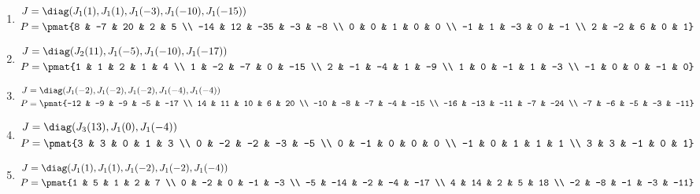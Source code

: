 \begin{enumerate}
\item

\begin{align*}
J &= \diag(J_{1}(1), J_{1}(1), J_{1}(-3), J_{1}(-10), J_{1}(-15))\\
P &= \pmat{8 & -7 & 20 & 2 & 5 \\ -14 & 12 & -35 & -3 & -8 \\ 0 & 0 & 1 & 0 & 0 \\ -1 & 1 & -3 & 0 & -1 \\ 2 & -2 & 6 & 0 & 1}
\end{align*}

\item

\begin{align*}
J &= \diag(J_{2}(11), J_{1}(-5), J_{1}(-10), J_{1}(-17))\\
P &= \pmat{1 & 1 & 2 & 1 & 4 \\ 1 & -2 & -7 & 0 & -15 \\ 2 & -1 & -4 & 1 & -9 \\ 1 & 0 & -1 & 1 & -3 \\ -1 & 0 & 0 & -1 & 0}
\end{align*}

\item

\begin{align*}
J &= \diag(J_{1}(-2), J_{1}(-2), J_{1}(-2), J_{1}(-4), J_{1}(-4))\\
P &= \pmat{-12 & -9 & -9 & -5 & -17 \\ 14 & 11 & 10 & 6 & 20 \\ -10 & -8 & -7 & -4 & -15 \\ -16 & -13 & -11 & -7 & -24 \\ -7 & -6 & -5 & -3 & -11}
\end{align*}

\item

\begin{align*}
J &= \diag(J_{3}(13), J_{1}(0), J_{1}(-4))\\
P &= \pmat{3 & 3 & 0 & 1 & 3 \\ 0 & -2 & -2 & -3 & -5 \\ 0 & -1 & 0 & 0 & 0 \\ -1 & 0 & 1 & 1 & 1 \\ 3 & 3 & -1 & 0 & 1}
\end{align*}

\item

\begin{align*}
J &= \diag(J_{1}(1), J_{1}(1), J_{1}(-2), J_{1}(-2), J_{1}(-4))\\
P &= \pmat{1 & 5 & 1 & 2 & 7 \\ 0 & -2 & 0 & -1 & -3 \\ -5 & -14 & -2 & -4 & -17 \\ 4 & 14 & 2 & 5 & 18 \\ -2 & -8 & -1 & -3 & -11}
\end{align*}


\end{enumerate}
